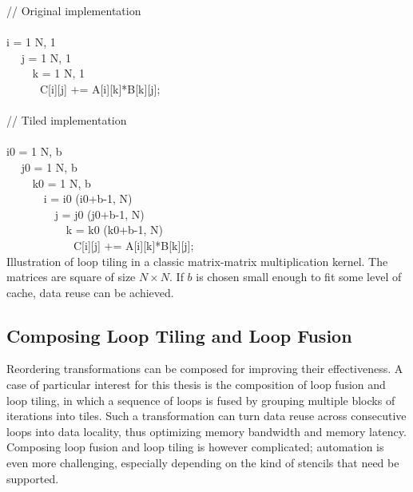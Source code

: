 \begin{algorithm}[t]
\scriptsize\ttfamily
{}

// Original implementation\\
~\\
 i = 1  N, 1\\
~~ j = 1  N, 1\\
~~~~ k = 1  N, 1\\
~~~~~~C[i][j] += A[i][k]*B[k][j];\\

~\\
// Tiled implementation\\
~\\
 i0 = 1  N, b\\
~~ j0 = 1  N, b\\
~~~~ k0 = 1  N, b\\
~~~~~~ i = i0  (i0+b-1, N)\\
~~~~~~~~ j = j0  (j0+b-1, N)\\
~~~~~~~~~~ k = k0  (k0+b-1, N)\\
~~~~~~~~~~~~C[i][j] += A[i][k]*B[k][j];\\


\caption{Illustration of loop tiling in a classic matrix-matrix multiplication kernel\protect\footnotemark. The matrices are square of size $N \times N$. If $b$ is chosen small enough to fit some level of cache, data reuse can be achieved.}
\label{code:loop-tiling}
\end{algorithm}


\subsection{Composing Loop Tiling and Loop Fusion}
\label{sec:bkg:tiling}
Reordering transformations can be composed for improving their effectiveness. A case of particular interest for this thesis is the composition of loop fusion and loop tiling, in which a sequence of loops is fused by grouping multiple blocks of iterations into tiles. Such a transformation can turn data reuse across consecutive loops into data locality, thus optimizing memory bandwidth and memory latency. Composing loop fusion and loop tiling is however complicated; automation is even more challenging, especially depending on the kind of stencils that need be supported.

